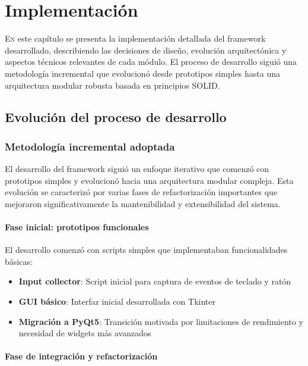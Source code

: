 \chapter{Implementación}
\label{chap:implementacion}

\lettrine{E}{n} este capítulo se presenta la implementación detallada del framework desarrollado, describiendo las decisiones de diseño, evolución arquitectónica y aspectos técnicos relevantes de cada módulo. El proceso de desarrollo siguió una metodología incremental que evolucionó desde prototipos simples hasta una arquitectura modular robusta basada en principios SOLID.

\section{Evolución del proceso de desarrollo}
\label{sec:evolucion_desarrollo}

\subsection{Metodología incremental adoptada}
\label{subsec:metodologia_incremental}

El desarrollo del framework siguió un enfoque iterativo que comenzó con prototipos simples y evolucionó hacia una arquitectura modular compleja. Esta evolución se caracterizó por varias fases de refactorización importantes que mejoraron significativamente la mantenibilidad y extensibilidad del sistema.

\subsubsection{Fase inicial: prototipos funcionales}

El desarrollo comenzó con scripts simples que implementaban funcionalidades básicas:

\begin{itemize}
    \item \textbf{Input collector}: Script inicial para captura de eventos de teclado y ratón
    \item \textbf{GUI básico}: Interfaz inicial desarrollada con Tkinter
    \item \textbf{Migración a PyQt5}: Transición motivada por limitaciones de rendimiento y necesidad de widgets más avanzados
\end{itemize}

\subsubsection{Fase de integración y refactorización}

